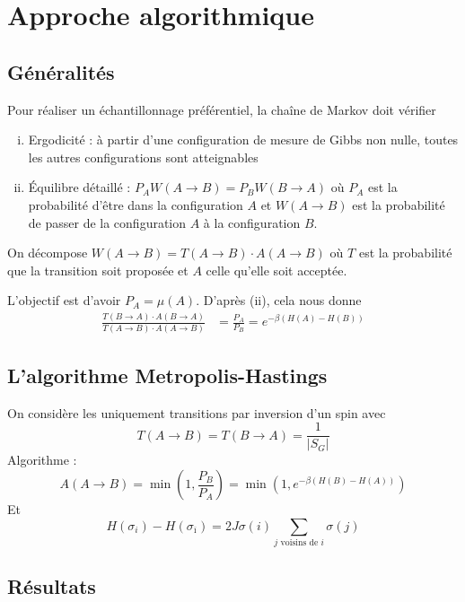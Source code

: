 \documentclass[french]{beamer}
\begin{document}
\section{Approche algorithmique}
\subsection{Généralités}

\begin{frame}
Pour réaliser un échantillonnage préférentiel, la chaîne de Markov doit vérifier
\begin{enumerate}[(i)]
	\item Ergodicité : à partir d'une configuration de mesure de Gibbs non nulle, toutes les autres configurations sont atteignables
	\item \'Equilibre détaillé : $P_AW(A \to B) = P_BW(B \to A)$ où $P_A$ est la probabilité d'être dans la configuration $A$ et $W(A \to B)$ est la probabilité de passer de la configuration $A$ à la configuration $B$.
\end{enumerate}
On décompose $W(A \to B) = T(A \to B) \cdot A(A \to B)$ où $T$ est la probabilité que la transition soit proposée et $A$ celle qu'elle soit acceptée.

L'objectif est d'avoir $P_A = \mu(A)$. D'après (ii), cela nous donne 
\begin{align*}
\frac{T(B \to A)\cdot A(B \to A)}{T(A\to B)\cdot A(A \to B)} &= \frac{P_A}{P_B} = e^{-\beta\left(H(A) - H(B)\right)}
\end{align*}
\end{frame}

%
\subsection{L'algorithme Metropolis-Hastings}
%

\begin{frame}
	On considère les uniquement transitions par inversion d'un spin avec \[T(A \to B) = T(B \to A) = \frac{1}{\left|S_G\right|}\]
	Algorithme  :
	\[
	A(A \to B) = \min\left(1, \frac{P_B}{P_A}\right) = \min\left(1, e^{-\beta(H(B) - H(A))}\right)
	\]
	Et
	\[
	H(\sigma_i) - H(\sigma_{\overline{\imath}}) = 2J\sigma(i) \sum_\text{$j$ voisins de $i$} \sigma(j)
	\]
\end{frame}

%
\subsection{Résultats}
%
\end{document}
